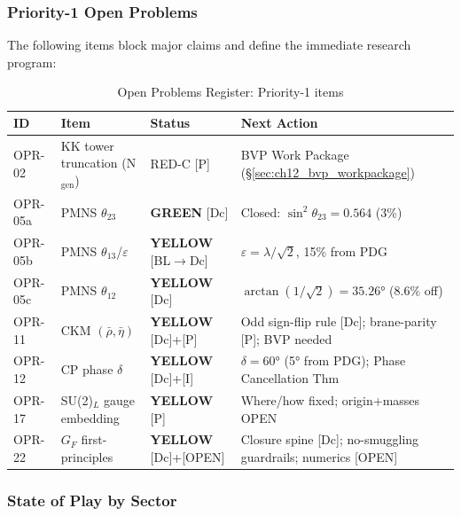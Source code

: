 \subsubsection{Priority-1 Open Problems}

The following items block major claims and define the immediate research program:

\begin{table}[ht]
\centering
\caption{Open Problems Register: Priority-1 items}
\label{tab:opr_p1}
\begin{tabular}{lp{5cm}lp{4cm}}
\toprule
\textbf{ID} & \textbf{Item} & \textbf{Status} & \textbf{Next Action} \\
\midrule
OPR-02 & KK tower truncation (N$_{\text{gen}}$) & RED-C [P] & BVP Work Package (\S\ref{sec:ch12_bvp_workpackage}) \\
OPR-05a & PMNS $\theta_{23}$ & \textcolor{OliveGreen}{\textbf{GREEN}} [Dc] & Closed: $\sin^2\theta_{23} = 0.564$ (3\%) \\
OPR-05b & PMNS $\theta_{13}$/$\varepsilon$ & \textcolor{YellowOrange}{\textbf{YELLOW}} [BL$\to$Dc] & $\varepsilon = \lambda/\sqrt{2}$, 15\% from PDG \\
OPR-05c & PMNS $\theta_{12}$ & \textcolor{YellowOrange}{\textbf{YELLOW}} [Dc] & $\arctan(1/\sqrt{2}) = 35.26°$ (8.6\% off) \\
OPR-11 & CKM $(\bar\rho, \bar\eta)$ & \textcolor{YellowOrange}{\textbf{YELLOW}} [Dc]+[P] & Odd sign-flip rule [Dc]; brane-parity [P]; BVP needed \\
OPR-12 & CP phase $\delta$ & \textcolor{YellowOrange}{\textbf{YELLOW}} [Dc]+[I] & $\delta = 60°$ (5° from PDG); Phase Cancellation Thm \\
OPR-17 & SU(2)$_L$ gauge embedding & \textcolor{YellowOrange}{\textbf{YELLOW}} [P] & Where/how fixed; origin+masses OPEN \\
OPR-22 & $G_F$ first-principles & \textcolor{YellowOrange}{\textbf{YELLOW}} [Dc]+[OPEN] & Closure spine [Dc]; no-smuggling guardrails; numerics [OPEN] \\
\bottomrule
\end{tabular}
\end{table}

\subsubsection{State of Play by Sector}

